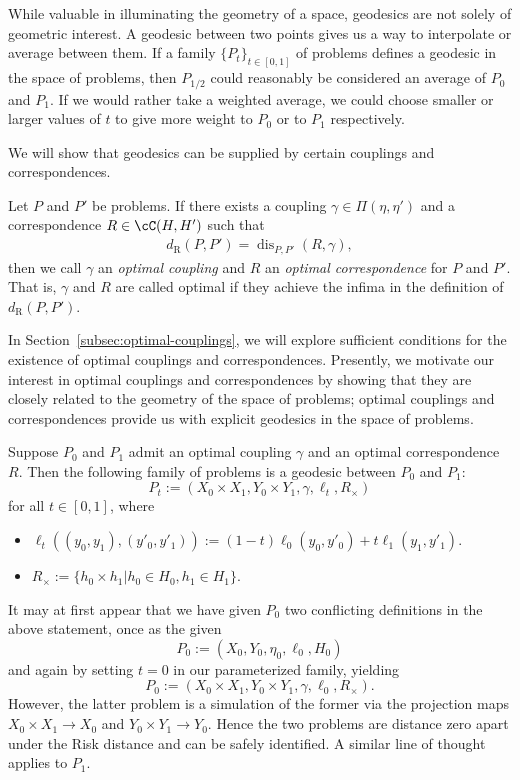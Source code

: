 \documentclass[twoside,11pt]{article}
\newcommand{\dexp}[1][]{d_{\mathrm{R}#1}}
\DeclareMathOperator{\dis}{dis}
\begin{document}
    While valuable in illuminating the geometry of a space, geodesics are not solely of geometric interest. A geodesic between two points gives us a way to interpolate or average between them. If a family $\{P_t\}_{t\in[0,1]}$ of problems defines a geodesic in the space of problems, then $P_{1/2}$ could reasonably be considered an average of $P_0$ and $P_1$. If we would rather take a weighted average, we could choose smaller or larger values of $t$ to give more weight to $P_0$ or to $P_1$ respectively.

    We will show that geodesics can be supplied by certain couplings and correspondences.
    
    \begin{definition}
        Let $P$ and $P'$ be problems.
        If there exists a coupling $\gamma\in \Pi(\eta,\eta')$ and a correspondence $R\in \cC(H,H')$ such that
        \begin{align*}
            \dexp(P,P') = \dis_{P,P'}(R,\gamma),
        \end{align*}
        then we call $\gamma$ an \emph{optimal coupling} and $R$ an \emph{optimal correspondence} for $P$ and $P'$. That is, $\gamma$ and $R$ are called optimal if they achieve the infima in the definition of $\dexp(P,P')$.
    \end{definition}
    In Section~\ref{subsec:optimal-couplings}, we will explore sufficient conditions for the existence of optimal couplings and correspondences. Presently, we motivate our interest in optimal couplings and correspondences by showing that they are closely related to the geometry of the space of problems; optimal couplings and correspondences provide us with explicit geodesics in the space of problems.

    \begin{theorem}\label{thm:geodesic-existence}
        Suppose $P_0$ and $P_1$ admit an optimal coupling $\gamma$ and an optimal correspondence $R$. Then the following family of problems is a geodesic between $P_0$ and $P_1$:
        \[P_t := (X_0\times X_1,Y_0\times Y_1,\gamma,\ell_t,R_\times)\]
        for all $t\in [0,1]$, where
        \begin{itemize}
            \item $\ell_t((y_0,y_1),(y'_0,y'_1)) := (1-t)\ell_0(y_0,y'_0) + t\ell_1(y_1,y'_1)$.
            \item $R_\times := \{h_0\times h_1 | h_0\in H_0, h_1\in H_1\}$.
        \end{itemize}
    \end{theorem}
    It may at first appear that we have given $P_0$ two conflicting definitions in the above statement, once as the given
    \[P_0 := (X_0,Y_0,\eta_0,\ell_0,H_0)\]
    and again by setting $t=0$ in our parameterized family, yielding
    \[P_0 := (X_0\times X_1,Y_0\times Y_1,\gamma,\ell_0,R_\times).\]
    However, the latter problem is a simulation of the former via the projection maps $X_0\times X_1 \to X_0$ and $Y_0\times Y_1 \to Y_0$. Hence the two problems are distance zero apart under the Risk distance and can be safely identified. A similar line of thought applies to $P_1$.
\end{document}

